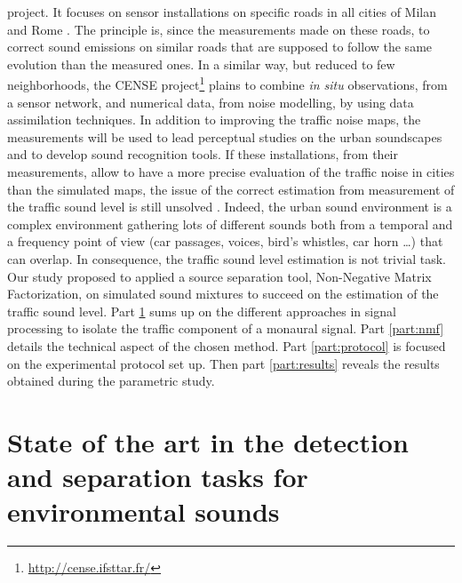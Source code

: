 \documentclass[twocolumn,a4paper,10pt]{article}
\begin{document}
project. It focuses on sensor installations on specific roads in all cities of Milan and Rome \cite{bellucci_life_2017}. The principle is, since the measurements made on these roads, to correct sound emissions on similar roads that are supposed to follow the same evolution than the measured ones. In a similar way, but reduced to few neighborhoods, the CENSE project\footnote{\url{http://cense.ifsttar.fr/}} \cite{} plains to combine \textit{in situ} observations, from a sensor network, and numerical data, from noise modelling, by using data assimilation techniques. In addition to improving the traffic noise maps, the measurements will be used to lead perceptual studies on the urban soundscapes and to develop sound recognition tools. If these installations, from their measurements, allow to have a more precise evaluation of the traffic noise in cities than the simulated maps, the issue of the correct estimation from measurement of the traffic sound level is still unsolved \cite{Mioduszewski}. Indeed, the urban sound environment is a complex environment gathering lots of different sounds both from a temporal and a frequency point of view (car passages, voices, bird's whistles, car horn \dots) that can overlap. In consequence, the traffic sound level estimation is not trivial task. Our study proposed to applied a source separation tool, Non-Negative Matrix Factorization, on simulated sound mixtures to succeed on the estimation of the traffic sound level. Part \ref{part:stateOfArt} sums up on the different approaches in signal processing to isolate the traffic component of a monaural signal. Part \ref{part:nmf} details the technical aspect of the chosen method. Part \ref{part:protocol} is focused on the experimental protocol set up. Then part \ref{part:results} reveals the results obtained during the parametric study. 

\section{State of the art in the detection and separation tasks for environmental sounds}\label{part:stateOfArt}
\end{document}
